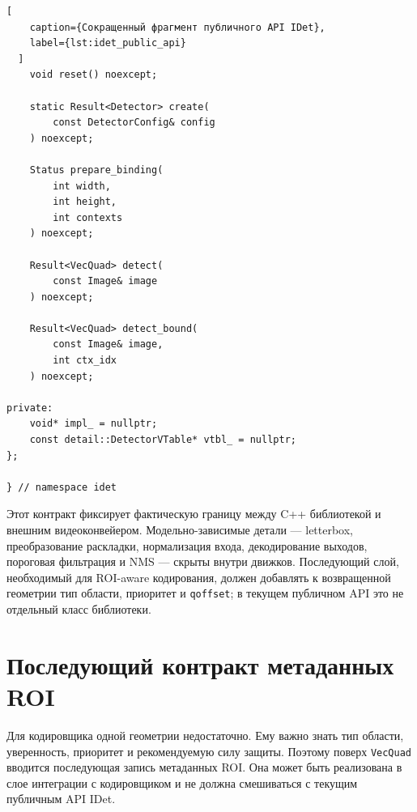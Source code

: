 \documentclass[12pt,a4paper,oneside,openany]{report}
\begin{document}
\begin{lstlisting}[
    caption={Сокращенный фрагмент публичного API IDet},
    label={lst:idet_public_api}
  ]
    void reset() noexcept;

    static Result<Detector> create(
        const DetectorConfig& config
    ) noexcept;

    Status prepare_binding(
        int width,
        int height,
        int contexts
    ) noexcept;

    Result<VecQuad> detect(
        const Image& image
    ) noexcept;

    Result<VecQuad> detect_bound(
        const Image& image,
        int ctx_idx
    ) noexcept;

private:
    void* impl_ = nullptr;
    const detail::DetectorVTable* vtbl_ = nullptr;
};

} // namespace idet
\end{lstlisting}

Этот контракт фиксирует фактическую границу между C++ библиотекой и внешним видеоконвейером.
Модельно-зависимые детали --- letterbox, преобразование раскладки, нормализация входа,
декодирование выходов, пороговая фильтрация и NMS --- скрыты внутри движков. Последующий слой,
необходимый для ROI-aware кодирования, должен добавлять к возвращенной геометрии тип области,
приоритет и \texttt{qoffset}; в текущем публичном API это не отдельный класс библиотеки.


\section{Последующий контракт метаданных ROI}

Для кодировщика одной геометрии недостаточно. Ему важно знать тип области, уверенность,
приоритет и рекомендуемую силу защиты. Поэтому поверх \texttt{VecQuad} вводится последующая
запись метаданных ROI. Она может быть реализована в слое интеграции с кодировщиком и не должна
смешиваться с текущим публичным API IDet.
\end{document}
